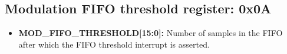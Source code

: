 \documentclass{article}
\newcommand{\bitrect}[2]{
  \begin{pgfonlayer}{foreground}
    \draw [thick] (0,0) rectangle (#1,1);
    \pgfmathsetmacro\result{#1-1}
    \foreach \x in {1,...,\result}
      \draw [thick] (\x,1) -- (\x, 0.8);
  \end{pgfonlayer}
  \bitlabels{#1}{#2}
}
\newcommand{\rwbits}[3]{
  \draw [thick] (#1,0) rectangle ++(#2,1) node[pos=0.5]{#3};
  \pgfmathsetmacro\start{#1+0.5}
  \pgfmathsetmacro\finish{#1+#2-0.5}
}
\newcommand{\bitlabels}[2]{
  \foreach \bit in {1,...,#1}{
     \pgfmathsetmacro\result{#2}
     \node [above] at (\bit-0.5, 1) {\pgfmathprintnumber{\result}};
   }
}
\begin{document}
\subsection{Modulation FIFO threshold register: 0x0A}
\label{reg:mod:fifo:thresh}
\begin{center}
\end{center}
\begin{itemize}
\item \textbf{MOD\_FIFO\_THRESHOLD[15:0]:} Number of samples in the FIFO after which the FIFO threshold interrupt is asserted.
\end{itemize}
\end{document}
